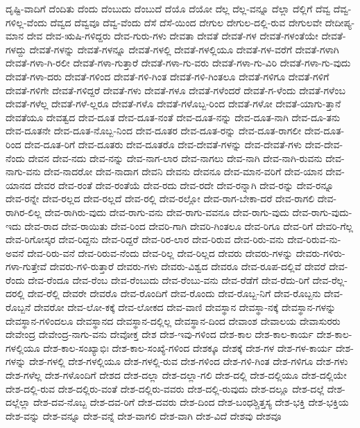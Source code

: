 {ದೃಷ್ಟಿ-ವಾದಿಗೆ
ದೆಂದಿತು
ದೆಂದು
ದೆಂಬುದು
ದೆಂಬುದೆ
ದೆಯೊ
ದೆಯೋ
ದೆಲ್ಲ
ದೆಲ್ಲ-ವನ್ನೂ
ದೆಲ್ಲಾ
ದೆಲ್ಲಿಗೆ
ದೆವ್ವ
ದೆವ್ವ-ಗಳಿಲ್ಲ-ವೆಂದು
ದೆವ್ವದ
ದೆವ್ವವೂ
ದೆವ್ವ-ವೆಂದು
ದೆಸೆ
ದೆಸೆ-ಯಿಂದ
ದೇಗುಲ
ದೇಗುಲ-ದಲ್ಲಿ-ರುವ
ದೇಗುಲವೇ
ದೇದೀಪ್ಯ-ಮಾನ
ದೇವ
ದೇವ-ಋಷಿ-ಗಳಿದ್ದರು
ದೇವ-ಗುರು-ಗಳು
ದೇವತಾ
ದೇವತೆ
ದೇವತೆ-ಗಳ
ದೇವತೆ-ಗಳಂತೆಯೇ
ದೇವತೆ-ಗಳದ್ದು
ದೇವತೆ-ಗಳನ್ನು
ದೇವತೆ-ಗಳನ್ನೂ
ದೇವತೆ-ಗಳಲ್ಲಿ
ದೇವತೆ-ಗಳಲ್ಲಿಯೂ
ದೇವತೆ-ಗಳ-ವರೆಗೆ
ದೇವತೆ-ಗಳಾಗಿ
ದೇವತೆ-ಗಳಾ-ಗಿ-ರಲೀ
ದೇವತೆ-ಗಳಾ-ಗುತ್ತಾರೆ
ದೇವತೆ-ಗಳಾ-ಗು-ವರು
ದೇವತೆ-ಗಳಾ-ಗು-ವಿರಿ
ದೇವತೆ-ಗಳಾ-ಗು-ವುದು
ದೇವತೆ-ಗಳಾ-ದರು
ದೇವತೆ-ಗಳಿಂದ
ದೇವತೆ-ಗಳಿ-ಗಿಂತ
ದೇವತೆ-ಗಳಿ-ಗಿಂತಲೂ
ದೇವತೆ-ಗಳಿಗೂ
ದೇವತೆ-ಗಳಿಗೆ
ದೇವತೆ-ಗಳಿಗೇ
ದೇವತೆ-ಗಳಿದ್ದರೆ
ದೇವತೆ-ಗಳು
ದೇವತೆ-ಗಳೂ
ದೇವತೆ-ಗಳೆಂದರೆ
ದೇವತೆ-ಗ-ಳೆಂದು
ದೇವತೆ-ಗಳೆಂಬ
ದೇವತೆ-ಗಳೆಲ್ಲ
ದೇವತೆ-ಗಳೆ-ಲ್ಲರೂ
ದೇವತೆ-ಗಳೊ
ದೇವತೆ-ಗಳೊಬ್ಬ-ರಿಂದ
ದೇವತೆ-ಗಳೋ
ದೇವತೆ-ಯಾಗು-ತ್ತಾನೆ
ದೇವತೆಯೂ
ದೇವತ್ವದ
ದೇವ-ದೂತ
ದೇವ-ದೂತ-ನಂತೆ
ದೇವ-ದೂತ-ನನ್ನು
ದೇವ-ದೂತ-ನಾಗಿ
ದೇವ-ದೂ-ತನು
ದೇವ-ದೂತನೇ
ದೇವ-ದೂತ-ನೊಬ್ಬ-ನಿಂದ
ದೇವ-ದೂತರ
ದೇವ-ದೂತ-ರನ್ನು
ದೇವ-ದೂತ-ರಾಗಲೀ
ದೇವ-ದೂತ-ರಿಂದ
ದೇವ-ದೂತ-ರಿಗೆ
ದೇವ-ದೂತರು
ದೇವ-ದೂತರೊ
ದೇವ-ದೇವತೆ-ಗಳನ್ನು
ದೇವ-ದೇವತೆ-ಗಳು
ದೇವ-ದೇವ-ನೆಂದು
ದೇವನ
ದೇವ-ನದು
ದೇವ-ನನ್ನು
ದೇವ-ನಾಗ-ಲಾರ
ದೇವ-ನಾಗಲು
ದೇವ-ನಾಗಿ
ದೇವ-ನಾಗಿ-ರುವನು
ದೇವ-ನಾಗು-ವನು
ದೇವ-ನಾದರೋ
ದೇವ-ನಾದಾಗ
ದೇವನಿ
ದೇವನು
ದೇವನೂ
ದೇವ-ಮಾನ-ವರಿಗೆ
ದೇವ-ಯಾನ
ದೇವ-ಯಾನದ
ದೇವರ
ದೇವ-ರಂತೆ
ದೇವ-ರಂತೆಯೆ
ದೇವ-ರದು
ದೇವ-ರದೇ
ದೇವ-ರನ್ನಾಗಿ
ದೇವ-ರನ್ನು
ದೇವ-ರನ್ನೂ
ದೇವ-ರನ್ನೇ
ದೇವ-ರಲ್ಲದ
ದೇವ-ರಲ್ಲದೆ
ದೇವ-ರಲ್ಲಿ
ದೇವ-ರಲ್ಲೋ
ದೇವ-ರಾಗ-ಬೇಕಾ-ದರೆ
ದೇವ-ರಾಗಲಿ
ದೇವ-ರಾಗಿರ-ಲಿಲ್ಲ
ದೇವ-ರಾಗಿರು-ವುದು
ದೇವ-ರಾಗು-ವನು
ದೇವ-ರಾಗು-ವವನೂ
ದೇವ-ರಾಗು-ವುದು
ದೇವ-ರಾಗು-ವುದು-ಇದು
ದೇವ-ರಾದ
ದೇವ-ರಾಯಿತು
ದೇವ-ರಿಂದ
ದೇವರಿ-ಗಾಗಿ
ದೇವರಿ-ಗಿಂತಲೂ
ದೇವ-ರಿಗೂ
ದೇವ-ರಿಗೆ
ದೇವರಿ-ಗೆಲ್ಲ
ದೇವ-ರಿಗೋಸ್ಕರ
ದೇವ-ರಿದ್ದನು
ದೇವ-ರಿದ್ದರೆ
ದೇವ-ರಿರ-ಲಾರ
ದೇವ-ರಿರುವ
ದೇವ-ರಿರು-ವನು
ದೇವ-ರಿರುವ-ನು-ಅವನೆ
ದೇವ-ರಿರು-ವನೆ
ದೇವ-ರಿರುವ-ನೆಂದು
ದೇವ-ರಿಲ್ಲ
ದೇವ-ರಿಲ್ಲದ
ದೇವರು
ದೇವರು-ಗಳನ್ನು
ದೇವರು-ಗಳಿರು-ಗಳಾ-ಗುತ್ತೇವೆ
ದೇವರು-ಗಳಿ-ರುತ್ತಾರೆ
ದೇವರು-ಗಳು
ದೇವರು-ವಿಶ್ವದ
ದೇವರೂ
ದೇವ-ರೂಪ-ದಲ್ಲಿವೆ
ದೇವರೆ
ದೇವ-ರೆಂದು
ದೇವ-ರೆಂದೂ
ದೇವ-ರೆಂಬ
ದೇವ-ರೆಂಬುದು
ದೇವ-ರೆಂಬು-ವನು
ದೇವ-ರೆಡೆಗೆ
ದೇವ-ರೆದು-ರಿಗೆ
ದೇವ-ರೆಲ್ಲ-ದರಲ್ಲಿ
ದೇವ-ರೆಲ್ಲಿ
ದೇವರೇ
ದೇವರೊ
ದೇವ-ರೊಂದಿಗೆ
ದೇವ-ರೊಂದು
ದೇವ-ರೊಬ್ಬ-ನಿಗೆ
ದೇವ-ರೊಬ್ಬನು
ದೇವ-ರೊಬ್ಬನೆ
ದೇವರೋ
ದೇವ-ಲೋ-ಕಕ್ಕೆ
ದೇವ-ಲೋಕದ
ದೇವ-ವಾಣಿ
ದೇವಸ್ಥಾನ
ದೇವಸ್ಥಾ-ನಕ್ಕೆ
ದೇವಸ್ಥಾನ-ಗಳನ್ನು
ದೇವಸ್ಥಾನ-ಗಳಿಂದಲೂ
ದೇವಸ್ಥಾನದ
ದೇವಸ್ಥಾನ-ದಲ್ಲಿಲ್ಲ
ದೇವಸ್ಥಾನ-ದಿಂದ
ದೇವಾಂಶ
ದೇವಾಲಯ
ದೇವಾಸುರರು
ದೇವೇಂದ್ರ
ದೇವೇಂದ್ರ-ನಾಗು-ವನು
ದೇವೋಕ್ತ
ದೇಶ
ದೇಶ-ಇವು-ಗಳಿಂದ
ದೇಶ-ಕಾಲ
ದೇಶ-ಕಾಲ-ಕಾರ್ಯ
ದೇಶ-ಕಾಲ-ಗಳಲ್ಲಿಯೂ
ದೇಶ-ಕಾಲ-ಸಂಖ್ಯಾಭಿಃ
ದೇಶ-ಕಾಲ-ಸಂಖ್ಯೆ-ಗಳಿಂದ
ದೇಶಕ್ಕೂ
ದೇಶಕ್ಕೆ
ದೇಶ-ಗಳ
ದೇಶ-ಗಳ-ಕಾರ್ಯ
ದೇಶ-ಗಳನ್ನು
ದೇಶ-ಗಳಲ್ಲಿ
ದೇಶ-ಗಳಲ್ಲಿಯೂ
ದೇಶ-ಗಳಲ್ಲಿ-ರುವ
ದೇಶ-ಗಳಿಂದ
ದೇಶ-ಗಳಿ-ಗಿಂತ
ದೇಶ-ಗಳಿಗೂ
ದೇಶ-ಗಳು
ದೇಶ-ಗಳೆಲ್ಲ
ದೇಶ-ಗಳೊಂದಿಗೆ
ದೇಶದ
ದೇಶ-ದಲ್ಲಾ
ದೇಶ-ದಲ್ಲಾ-ಗಲಿ
ದೇಶ-ದಲ್ಲಿ
ದೇಶ-ದಲ್ಲಿಯೂ
ದೇಶ-ದಲ್ಲಿಯೇ
ದೇಶ-ದಲ್ಲಿ-ರುವ
ದೇಶ-ದಲ್ಲಿರು-ವಂತೆ
ದೇಶ-ದಲ್ಲಿರು-ವವರು
ದೇಶ-ದಲ್ಲಿ-ರುವುದು
ದೇಶ-ದಲ್ಲೂ
ದೇಶ-ದಲ್ಲೆ
ದೇಶ-ದಲ್ಲೆಲ್ಲಾ
ದೇಶ-ದವ-ನೊಬ್ಬ
ದೇಶ-ದವ-ರಿಗೆ
ದೇಶ-ದವರು
ದೇಶ-ದಿಂದ
ದೇಶ-ಬಂಧಶ್ಚಿತ್ತಸ್ಯ
ದೇಶ-ಭಕ್ತಿ
ದೇಶ-ಭಕ್ತಿಯ
ದೇಶ-ವನ್ನು
ದೇಶ-ವನ್ನೂ
ದೇಶ-ವನ್ನೆ
ದೇಶ-ವಾಗಲಿ
ದೇಶ-ವಾಗಿ
ದೇಶ-ವಿದೆ
ದೇಶವು
ದೇಶವೂ
}
